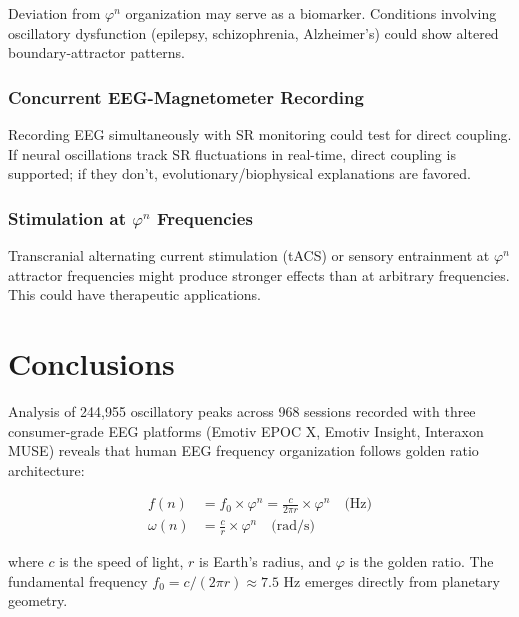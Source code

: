 \documentclass[11pt,a4paper]{article}
\newcommand{\phisym}{\varphi}
\newcommand{\fzero}{f_0}
\begin{document}
Deviation from $\phisym^n$ organization may serve as a biomarker. Conditions involving oscillatory dysfunction (epilepsy, schizophrenia, Alzheimer's) could show altered boundary-attractor patterns.

\subsubsection{Concurrent EEG-Magnetometer Recording}

Recording EEG simultaneously with SR monitoring could test for direct coupling. If neural oscillations track SR fluctuations in real-time, direct coupling is supported; if they don't, evolutionary/biophysical explanations are favored.

\subsubsection{Stimulation at $\phisym^n$ Frequencies}

Transcranial alternating current stimulation (tACS) or sensory entrainment at $\phisym^n$ attractor frequencies might produce stronger effects than at arbitrary frequencies. This could have therapeutic applications.

\section{Conclusions}

Analysis of 244,955 oscillatory peaks across 968 sessions recorded with three consumer-grade EEG platforms (Emotiv EPOC X, Emotiv Insight, Interaxon MUSE) reveals that human EEG frequency organization follows golden ratio architecture:

\begin{keyequation}
\begin{align}
f(n) &= \fzero \times \phisym^n = \frac{c}{2\pi r} \times \phisym^n \quad \text{(Hz)} \\[0.3cm]
\omega(n) &= \frac{c}{r} \times \phisym^n \quad \text{(rad/s)}
\end{align}

\vspace{0.2cm}
\noindent where $c$ is the speed of light, $r$ is Earth's radius, and $\phisym$ is the golden ratio. The fundamental frequency $\fzero = c/(2\pi r) \approx 7.5$ Hz emerges directly from planetary geometry.
\end{keyequation}
\end{document}

